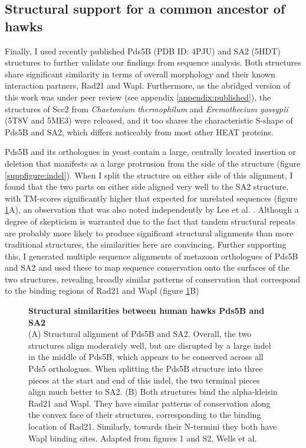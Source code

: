 \documentclass[a4paper,11pt,twoside,openright]{scrbook}
\begin{document}
\subsection{Structural support for a common ancestor of hawks}
Finally, I used recently published Pds5B \cite{Ouyang2016} (PDB ID: 4PJU) and SA2 \cite{Hara2014} (5HDT) structures to further validate our findings from sequence analysis. Both structures share significant similarity in terms of overall morphology and their known interaction partners, Rad21 and Wapl. Furthermore, as the abridged version of this work was under peer review \cite{Wells2017} (see appendix \ref{appendix:published}), the structures of Scc2 from \textit{Chaetonium thermophilum} \cite{Kikuchi2016} and \textit{Eremothecium gossypii} \cite{Chao2017} (5T8V and 5ME3) were released, and it too shares the characteristic S-shape of Pds5B and SA2, which differs noticeably from most other HEAT proteins.

Pds5B and its orthologues in yeast contain a large, centrally located insertion or deletion that manifests as a large protrusion from the side of the structure (figure \ref{suppfigure:indel}). When I split the structure on either side of this alignment, I found that the two parts on either side aligned very well to the SA2 structure, with TM-scores significantly higher that expected for unrelated sequences (figure \ref{figure:smcstruc}A), an observation that was also noted independently by Lee et al. \cite{Lee2016}. Although a degree of skepticism is warranted due to the fact that tandem structural repeats are probably more likely to produce significant structural alignments than more traditional structures, the similarities here are convincing. Further supporting this, I generated multiple sequence alignments of metazoan orthologues of Pds5B and SA2 and used these to map sequence conservation onto the surfaces of the two structures, revealing broadly similar patterns of conservation that correspond to the binding regions of Rad21 and Wapl (figure \ref{figure:smcstruc}B)

\begin{figure}[h]
    \caption[Structural similarities between human hawks Pds5B and SA2]{\sffamily \textbf{Structural similarities between human hawks Pds5B and SA2} \\ \small (A) Structural alignment of Pds5B and SA2. Overall, the two structures align moderately well, but are disrupted by a large indel in the middle of Pds5B, which appears to be conserved across all Pds5 orthologues. When splitting the Pds5B structure into three pieces at the start and end of this indel, the two terminal pieces align much better to SA2. (B) Both structures bind the alpha-kleisin Rad21 and Wapl. They have similar patterns of conservation along the convex face of their structures, corresponding to the binding location of Rad21. Similarly, towards their N-termini they both have Wapl binding sites. Adapted from figures 1 and S2, Wells et al. \cite{Wells2017}}
    \label{figure:smcstruc}
\end{figure}
\end{document}

